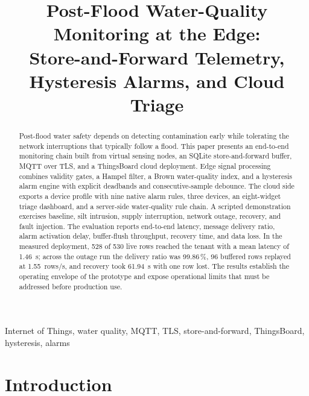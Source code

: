 \documentclass[conference]{IEEEtran}
\title{Post-Flood Water-Quality Monitoring at the Edge:\\
Store-and-Forward Telemetry, Hysteresis Alarms, and Cloud Triage}
\author{
\IEEEauthorblockN{[Group member 1], [Group member 2], [Group member 3], Sambid Shrestha}
\IEEEauthorblockA{ITS67404 Internet of Things -- Assessment Task 3 \\
{[}Institution{]}, {[}City{]}, {[}Country{]} \\
{[}email addresses{]}}
}
\begin{document}
\maketitle

\begin{abstract}
Post-flood water safety depends on detecting contamination early while tolerating the
network interruptions that typically follow a flood. This paper presents an end-to-end
monitoring chain built from virtual sensing nodes, an SQLite store-and-forward buffer,
MQTT over TLS, and a ThingsBoard cloud deployment. Edge signal processing combines
validity gates, a Hampel filter, a Brown water-quality index, and a hysteresis alarm
engine with explicit deadbands and consecutive-sample debounce. The cloud side exports
a device profile with nine native alarm rules, three devices, an eight-widget triage
dashboard, and a server-side water-quality rule chain. A scripted demonstration
exercises baseline, silt intrusion, supply interruption, network outage, recovery, and
fault injection. The evaluation reports end-to-end latency, message delivery ratio,
alarm activation delay, buffer-flush throughput, recovery time, and data loss. In the
measured deployment, 528 of 530 live rows reached the tenant with a mean latency of
1.46~s; across the outage run the delivery ratio was 99.86\,\%, 96 buffered rows
replayed at 1.55~rows/s, and recovery took 61.94~s with one row lost. The results
establish the operating envelope of the prototype and expose operational limits that
must be addressed before production use.
\end{abstract}

\begin{IEEEkeywords}
Internet of Things, water quality, MQTT, TLS, store-and-forward, ThingsBoard, hysteresis, alarms
\end{IEEEkeywords}

\section{Introduction}
\label{sec:intro}
\end{document}
